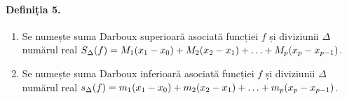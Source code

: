 \paragraph{Definiția 5.}
\begin{enumerate}[label=\emph{\alph*})]
    \item Se numește suma Darboux superioară asociată funcției $f$ și diviziunii $\Delta$ numărul real
    $S_{\Delta}(f) = M_{1}(x_{1}-x_{0}) + M_{2}(x_{2}-x_{1}) + \mathellipsis + M_{p}(x_{p} - x_{p-1})$.
    \item Se numește suma Darboux inferioară asociată funcției $f$ și diviziunii $\Delta$ numărul real
    $s_{\Delta}(f) = m_{1}(x_{1}-x_{0}) + m_{2}(x_{2}-x_{1}) + \mathellipsis + m_{p}(x_{p} - x_{p-1})$.
\end{enumerate}
